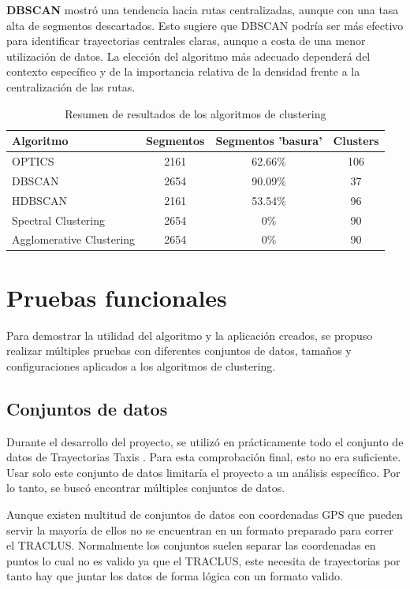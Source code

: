 \textbf{DBSCAN} mostró una tendencia hacia rutas centralizadas, aunque con una tasa alta de segmentos descartados. Esto sugiere que DBSCAN podría ser más efectivo para identificar trayectorias centrales claras, aunque a costa de una menor utilización de datos. La elección del algoritmo más adecuado dependerá del contexto específico y de la importancia relativa de la densidad frente a la centralización de las rutas.

\begin{table}[ht]
\centering
\begin{tabular}{|l|c|c|c|}
\hline
\textbf{Algoritmo} & \textbf{Segmentos} & \textbf{Segmentos 'basura'} & \textbf{Clusters}  \\
\hline
OPTICS & 2161 & 62.66\% & 106 \\
DBSCAN & 2654 & 90.09\% & 37 \\
HDBSCAN & 2161 & 53.54\% & 96 \\
Spectral Clustering & 2654 & 0\% & 90 \\
Agglomerative Clustering & 2654 & 0\% & 90 \\
\hline
\end{tabular}
\caption{Resumen de resultados de los algoritmos de clustering}
\label{tabla:comparacion_algoritmos}
\end{table}



\section{Pruebas funcionales}

Para demostrar la utilidad del algoritmo y la aplicación creados, se propuso realizar múltiples pruebas con diferentes conjuntos de datos, tamaños y configuraciones aplicados a los algoritmos de clustering.

\subsection{Conjuntos de datos}

Durante el desarrollo del proyecto, se utilizó en prácticamente todo el conjunto de datos de Trayectorias Taxis \cite{trayectorias_taxis}. Para esta comprobación final, esto no era suficiente. Usar solo este conjunto de datos limitaría el proyecto a un análisis específico. Por lo tanto, se buscó encontrar múltiples conjuntos de datos.

Aunque existen multitud de conjuntos de datos con coordenadas GPS que pueden servir la mayoría de ellos no se encuentran en un formato preparado para correr el TRACLUS. Normalmente los conjuntos suelen separar las coordenadas en puntos lo cual no es valido ya que el TRACLUS, este necesita de trayectorias por tanto hay que juntar los datos de forma lógica con un formato valido. 

